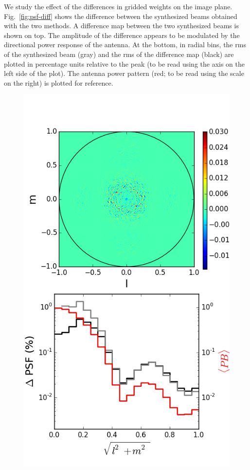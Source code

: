 \documentclass[a4paper,fleqn,usenatbib]{mnras}
\begin{document}
We study the effect of the differences in gridded weights on the image plane. 
Fig.~\ref{fig:psf-diff} shows the difference between the synthesized beams 
obtained with the two methods. A difference map between the two synthesized 
beams is shown on top. The amplitude of the difference appears to be 
modulated by the directional power response of the antenna. At the bottom, 
in radial bins, the rms of the synthesized beam (gray) and the rms of the 
difference map (black) are plotted in percentage units relative to the peak 
(to be read using the axis on the left side of the plot). The antenna power 
pattern (red; to be read using the scale on the right) is plotted for reference. 

\begin{figure}
  \includegraphics[width=\columnwidth]{diff_psf_MOFF-FX_test_aperture}

\end{figure}
\end{document}
